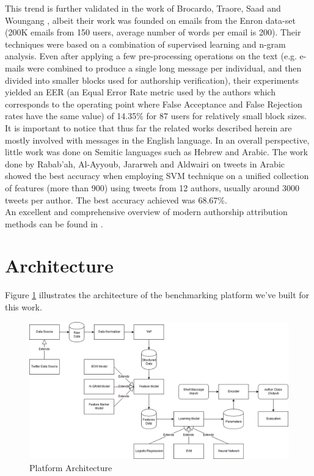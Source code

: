 \documentclass[a4paper]{article}
\begin{document}
This trend is further validated in the work of Brocardo, Traore, Saad and Woungang \cite{brocardo}, albeit their work was founded on emails from the Enron data-set (200K emails from 150 users, average number of words per email is 200). Their techniques were based on a combination of supervised learning and n-gram analysis. Even after applying a few pre-processing operations on the text (e.g. e-mails were combined to produce a single long message per individual, and then divided into smaller blocks used for authorship verification), their experiments yielded an EER (an Equal Error Rate metric used by the authors which corresponds to the operating point where False Acceptance and False Rejection rates have the same value) of 14.35\% for 87 users for relatively small block sizes.\\
It is important to notice that thus far the related works described herein are mostly involved with messages in the English language. In an overall perspective, little work was done on Semitic languages such as Hebrew and Arabic. The work done by Rabab’ah, Al-Ayyoub, Jararweh and Aldwairi \cite{rabab} on tweets in Arabic showed the best accuracy when employing SVM technique on a unified collection of features (more than 900) using tweets from 12 authors, usually around 3000 tweets per author. The best accuracy achieved was 68.67\%.\\
An excellent and comprehensive overview of modern authorship attribution methods can be found in \cite{stamatatos}.

\section{Architecture}
\label{Architecture}

Figure \ref{fig:architecture} illustrates the architecture of the benchmarking platform we've built for this work.\\
\begin{figure}[hb]
	\centering
	\includegraphics[width=.7\textwidth]{"architecture/NLP Author Classification Architecture"}
	\caption{Platform Architecture}
		\label{fig:architecture}
\end{figure}\\
\end{document}
